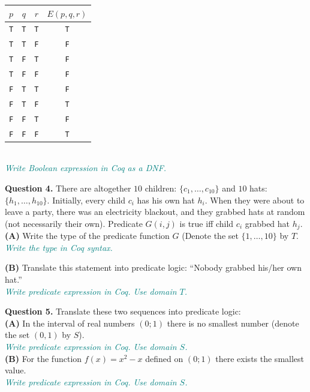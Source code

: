 \documentclass[jou]{apa6}
\begin{document}
\begin{tabular}{ c | c | c | c }
$p$ & $q$ & $r$ & $E(p,q,r)$ \\ \hline
{\tt T} & {\tt T} & {\tt T} & {\tt T} \\ \hline
{\tt T} & {\tt T} & {\tt F} & {\tt F} \\ \hline
{\tt T} & {\tt F} & {\tt T} & {\tt F} \\ \hline
{\tt T} & {\tt F} & {\tt F} & {\tt F} \\ \hline
{\tt F} & {\tt T} & {\tt T} & {\tt F} \\ \hline
{\tt F} & {\tt T} & {\tt F} & {\tt T} \\ \hline
{\tt F} & {\tt F} & {\tt T} & {\tt F} \\ \hline
{\tt F} & {\tt F} & {\tt F} & {\tt T} \\ \hline
\end{tabular}\\
\textcolor{teal}{\em Write Boolean expression in Coq as a DNF.}



{\bf Question 4.} There are altogether $10$ children: $\{ c_1,\ldots,c_{10} \}$ and 
$10$ hats: $\{ h_1,\ldots,h_{10} \}$. Initially, every child $c_i$ has his own hat $h_i$.
When they were about to leave a party, there was an electricity 
blackout, and they grabbed hats at random (not necessarily their own). 
Predicate $G(i,j)$ is true iff child $c_i$ grabbed hat $h_j$.\\
{\bf (A)} Write the type of the predicate function $G$ (Denote the set $\{1,\ldots,10\}$ by $T$.\\
\textcolor{teal}{\em Write the type in Coq syntax.}

{\bf (B)} Translate this statement into predicate logic: ``Nobody grabbed his/her own hat.''\\
\textcolor{teal}{\em Write predicate expression in Coq. Use domain $T$.}



{\bf Question 5.} Translate these two sequences into predicate logic:\\
{\bf (A)} In the interval of real numbers $(0;1)$ there is no smallest number (denote 
the set $(0,1)$ by $S$).\\
\textcolor{teal}{\em Write predicate expression in Coq. Use domain $S$.}\\
{\bf (B)} For the function $f(x) = x^2 - x$ defined on $(0;1)$ there exists the smallest value.\\
\textcolor{teal}{\em Write predicate expression in Coq. Use domain $S$.}
\end{document}
